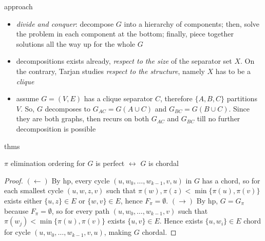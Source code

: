 \documentclass{beamer}
\begin{document}
\begin{frame}{approach}
\begin{itemize}
    \item \textit{divide and conquer}: decompose $G$ into a hierarchy of
    components; then, solve the problem in each component at the bottom;
    finally, piece together solutions all the way up for the whole $G$
    \item decompositions exists already, \textit{respect to the size} of the
    separator set $X$.  On the contrary, Tarjan studies \textit{respect to the
    structure}, namely $X$ has to be a \textit{clique}
    \item assume $G=(V, E)$ has a clique separator $C$, therefore $ \lbrace A,
    B, C \rbrace$ partitions $V$. So, $G$ decomposes to $G_{AC}=G(A\cup C)$ and
    $G_{BC}=G(B\cup C)$. Since they are both graphs, then recurs on both $G_{AC}$
    and $G_{BC}$ till no further decomposition is possible
\end{itemize}
\end{frame}

\begin{frame}{thms}
\begin{theorem}
$\pi$ elimination ordering for $G$ is perfect $\leftrightarrow$ $G$ is chordal
\end{theorem}
\begin{proof}
$(\leftarrow)$ By hp, every cycle $(u, w_{0}, \ldots, w_{k-1}, v, u)$ in $G$ has a chord, 
so for each smallest cycle $(u, w, z, v)$ such that
$\pi(w),\pi(z)<\min{\lbrace\pi(u), \pi(v)\rbrace}$ exists either $ \lbrace u,z
\rbrace\in E$ or $ \lbrace w,v \rbrace\in E$, hence $F_{\pi}=\emptyset$.
\vfill
$(\rightarrow)$ By hp, $G=G_{\pi}$ because $F_{\pi}=\emptyset$, so for every
path $(u, w_{0}, \ldots, w_{k-1}, v)$ such that $\pi(w_{j})< \min{ \lbrace \pi(u), \pi(v) \rbrace}$
exists $ \lbrace u, v \rbrace\in E$. Hence exists $ \lbrace u, w_{i} \rbrace\in
E$ chord for cycle $(u, w_{0}, \ldots, w_{k-1}, v, u)$, making $G$ chordal.

\end{proof}
\end{frame}
\end{document}
